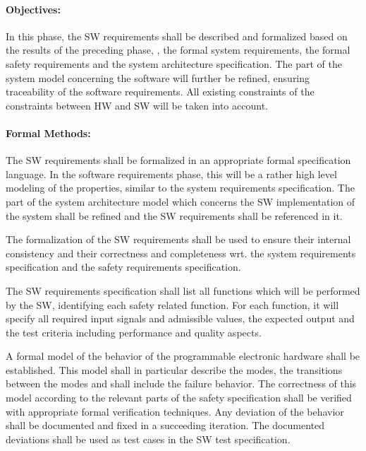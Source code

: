 \paragraph{Objectives:}
\label{sec:sw-req-objective}
In this phase, the SW requirements shall be described and formalized based on
the results of the preceding phase, \ie, the formal system requirements, the
formal safety requirements and the system architecture specification. The part
of the system model concerning the software will further be refined, ensuring
traceability of the software requirements. All existing constraints of the
constraints between HW and SW will be taken into account.

\paragraph{Formal Methods:}
\label{sec:sw-req-formal-methods}
The SW requirements shall be formalized in an appropriate formal specification
language. In the software requirements phase, this will be a rather high level
modeling of the properties, similar to the system requirements
specification. The part of the system architecture model which concerns the SW
implementation of the system shall be refined and the SW requirements shall be
referenced in it.

The formalization of the SW requirements shall be used to ensure their internal
consistency and their correctness and completeness wrt. the system requirements
specification and the safety requirements specification.

The SW requirements specification shall list all functions which will be
performed by the SW, identifying each safety related function. For each
function, it will specify all required input signals and admissible values, the
expected output and the test criteria including performance and quality aspects.

A formal model of the behavior of the programmable electronic hardware shall be
established. This model shall in particular describe the modes, the transitions
between the modes and shall include the failure behavior. The correctness of
this model according to the relevant parts of the safety specification shall be
verified with appropriate formal verification techniques. Any deviation of the
behavior shall be documented and fixed in a succeeding iteration. The documented
deviations shall be used as test cases in the SW test specification.


